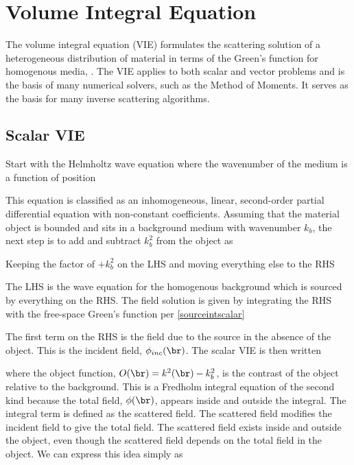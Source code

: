 {\footnotesize
{}
}

{\footnotesize
{}
}

\clearpage
\newpage
\section{Volume Integral Equation}

The volume integral equation (VIE) formulates the scattering solution of a heterogeneous distribution of material in terms of the Green's function for homogenous media, \cite{chew1995waves}. The VIE applies to both scalar and vector problems and is the basis of many numerical solvers, such as the Method of Moments. It serves as the basis for many inverse scattering algorithms. 

\subsection{Scalar VIE}
Start with the Helmholtz wave equation where the wavenumber of the medium is a function of position

This equation is classified as an inhomogeneous, linear, second-order partial differential equation with non-constant coefficients. Assuming that the material object is bounded and sits in a background medium with wavenumber $k_b$, the next step is to add and subtract $k_b^2$ from the object as

Keeping the factor of $+k_b^2$ on the LHS and moving everything else to the RHS 

The LHS is the wave equation for the homogenous background which is sourced by everything on the RHS. The field solution is given by integrating the RHS with the free-space Green's function per \eqref{sourceintscalar} 

The first term on the RHS is the field due to the source in the absence of the object. This is the incident field, $\phi_{inc}(\br)$. The scalar VIE is then written

\noindent where the object function, $O(\br) = k^2(\br) - k_b^2 $, is the contrast of the object relative to the background.  This is a Fredholm integral equation of the second kind because the total field, $\phi(\br)$, appears inside and outside the integral. The integral term is defined as the scattered field. The scattered field modifies the incident field to give the total field. The scattered field exists inside and outside the object, even though the scattered field depends on the total field in the object. We can express this idea simply as

